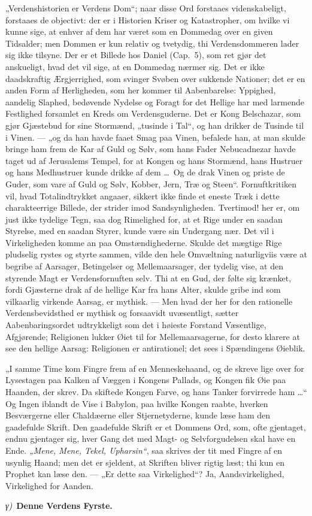\documentclass[12pt]{book}
\newcommand{\greekrun}[2]{%
  \medskip\begin{center}{\itshape #1)}\ {\bfseries #2}\end{center}\medskip}
\begin{document}
„Verdenshistorien er Verdens Dom“; naar disse Ord forstaaes
videnskabeligt, forstaaes de objectivt: der er i Historien Kriser og
Katastropher, om hvilke vi kunne sige, at enhver af dem har været
som en Dommedag over en given Tidsalder; men Dommen er kun relativ
og tvetydig, thi Verdensdommeren lader sig ikke tilsyne. Der er et
Billede hos Daniel (Cap.\ 5), som ret gjør det anskueligt, hvad det
vil sige, at en Dommedag nærmer sig. Det er ikke daadskraftig
Ærgjerrighed, som svinger Svøben over sukkende Nationer; det er en
anden Form af Herligheden, som her kommer til Aabenbarelse:
Yppighed, aandelig Slaphed, bedøvende Nydelse og Foragt for det
Hellige har med larmende Festlighed forsamlet en Kreds om
Verdensguderne. Det er Kong Belschazar, som gjør Gjæstebud for sine
Stormænd, „tusinde i Tal“, og han drikker de Tusinde til i Vinen.
--- „og da han havde faaet Smag paa Vinen, befalede han, at man
skulde bringe ham frem de Kar af Guld og Sølv, som hans Fader
Nebucadnezar havde taget ud af Jerusalems Tempel, for at Kongen og
hans Stormænd, hans Hustruer og hans Medhustruer kunde drikke af dem
\dots\ Og de drak Vinen og priste de Guder, som vare af Guld og
Sølv, Kobber, Jern, Træ og Steen“.
Fornuftkritiken vil, hvad Totalindtrykket angaaer, sikkert ikke
finde et eneste Træk i dette charakteerrige Billede, der strider
imod Sandsynligheden. Tvertimod! her er, om just ikke tydelige Tegn,
saa dog Rimelighed for, at et Rige under en saadan Styrelse, med en
saadan Styrer, kunde være sin Undergang nær. Det vil i Virkeligheden
komme an paa Omstændighederne. Skulde det mægtige Rige pludselig
rystes og styrte sammen, vilde den hele Omvæltning naturligviis være
at begribe af Aarsager, Betingelser og Mellemaarsager, der tydelig
vise, at den styrende Magt er Verdensfornuften selv. Thi at en Gud,
der følte sig krænket, fordi Gjæsterne drak af de hellige Kar fra
hans Alter, skulde gribe ind som vilkaarlig virkende Aarsag, er
mythisk. --- Men hvad der her for den rationelle Verdensbevidsthed
er mythisk og forsaavidt uvæsentligt, sætter Aabenbaringsordet
udtrykkeligt som det i høieste Forstand Væsentlige, Afgjørende;
Religionen lukker Øiet til for Mellemaarsagerne, for desto klarere
at see den hellige Aarsag: Religionen er antirationel; det sees i
Spændingens Øieblik.

„I samme Time kom Fingre frem af en Menneskehaand, og de skreve lige
over for Lysestagen paa Kalken af Væggen i Kongens Pallads, og
Kongen fik Øie paa Haanden, der skrev. Da skiftede Kongen Farve, og
hans Tanker forvirrede ham \dots“ Og Ingen iblandt de Vise i
Babylon, paa hvilke Kongen raabte, hverken Besværgerne eller
Chaldæerne eller Stjernetyderne, kunde læse ham den gaadefulde
Skrift. Den gaadefulde Skrift er et Dommens Ord, som, ofte
gjentaget, endnu gjentager sig, hver Gang det med Magt- og
Selvforgudelsen skal have en Ende. \textit{„Mene, Mene, Tekel,
Upharsin“}, saa skrives der tit med Fingre af en usynlig Haand; men
det er sjeldent, at Skriften bliver rigtig læst; thi kun en Prophet
kan læse den. --- „Er dette saa Virkelighed“? Ja,
Aandsvirkelighed, Virkelighed for Aanden.
\greekrun{γ}{Denne Verdens Fyrste.}
\end{document}

